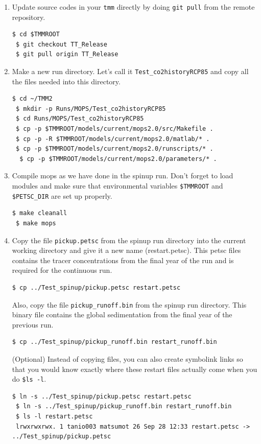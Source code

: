 \documentclass[a4paper]{article}
\def\noin{\noindent }
\begin{document}
\begin{enumerate}

\item Update source codes in your \verb|tmm| directly by doing \verb|git pull| from the remote repository.
\begin{lstlisting}[style=DOS]
 $ cd $TMMROOT
 $ git checkout TT_Release
 $ git pull origin TT_Release
\end{lstlisting}

\item Make a new run directory. Let's call it \verb|Test_co2historyRCP85| and copy all the files needed into this directory.
\begin{lstlisting}[style=DOS]
 $ cd ~/TMM2
 $ mkdir -p Runs/MOPS/Test_co2historyRCP85
 $ cd Runs/MOPS/Test_co2historyRCP85
 $ cp -p $TMMROOT/models/current/mops2.0/src/Makefile .
 $ cp -p -R $TMMROOT/models/current/mops2.0/matlab/* .
 $ cp -p $TMMROOT/models/current/mops2.0/runscripts/* .
  $ cp -p $TMMROOT/models/current/mops2.0/parameters/* .
\end{lstlisting}

\item Compile mops as we have done in the spinup run. Don't forget to load modules and make sure that environmental variables \verb|$TMMROOT| and \verb|$PETSC_DIR| are set up properly.
\begin{lstlisting}[style=DOS]
 $ make cleanall
 $ make mops
\end{lstlisting}

\item Copy the file \verb|pickup.petsc| from the spinup run directory into the current working directory and give it a new name (restart.petsc). This petsc files contains the tracer concentrations from the final year of the run and is required for the continuous run.

\begin{lstlisting}[style=DOS]
 $ cp ../Test_spinup/pickup.petsc restart.petsc
\end{lstlisting}

\noin Also, copy the file \verb|pickup_runoff.bin| from the spinup run directory. This binary file contains the global sedimentation from the final year of the previous run.
\begin{lstlisting}[style=DOS]
 $ cp ../Test_spinup/pickup_runoff.bin restart_runoff.bin
\end{lstlisting}

\noin (Optional) Instead of copying files, you can also create symbolink links so that you would know exactly where these restart files actually come when you do \verb|$ls -l|.
\begin{lstlisting}[style=DOS]
 $ ln -s ../Test_spinup/pickup.petsc restart.petsc
 $ ln -s ../Test_spinup/pickup_runoff.bin restart_runoff.bin
 $ ls -l restart.petsc
 lrwxrwxrwx. 1 tanio003 matsumot 26 Sep 28 12:33 restart.petsc -> ../Test_spinup/pickup.petsc
\end{lstlisting}


\end{enumerate}
\end{document}
